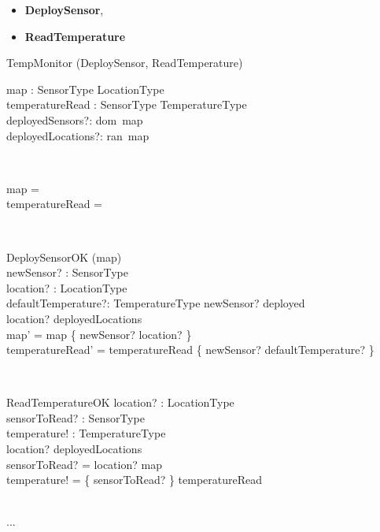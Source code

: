 \documentclass[12pt]{article}
\begin{document}
\begin{itemize}
	\item \textbf{DeploySensor},
	\item \textbf{ReadTemperature}
\end{itemize}

\newpage

\begin{class}{TempMonitor}
\also
\upharpoonright (DeploySensor, ReadTemperature) \\
\begin{state}
map : SensorType \pfun LocationType\\
temperatureRead : SensorType \pfun TemperatureType\\
\where
deployedSensors?: dom~map\\
deployedLocations?: ran~map\\
\end{state} \\
\begin{init}
map = \emptyset\\
temperatureRead = \emptyset
\end{init} \\
\begin{op}{DeploySensorOK}
\Delta (map) \\
newSensor? : SensorType\\
location? : LocationType\\
defaultTemperature?: TemperatureType
\ST
newSensor? \notin deployed\\
location? \notin deployedLocations\\
map' = map \cup \{ newSensor? \mapsto location? \}\\
temperatureRead' = temperatureRead \cup \{ newSensor? \mapsto defaultTemperature? \}
\end{op}\\
\begin{op}{ReadTemperatureOK}
location? : LocationType\\
sensorToRead? : SensorType\\
temperature! : TemperatureType\\
\ST
location? \in deployedLocations\\
sensorToRead? = {location?} \triangleleft map\\
temperature! = \{ sensorToRead? \} \triangleright  temperatureRead\\
\end{op}\\
...\\
\end{class}
\end{document}
